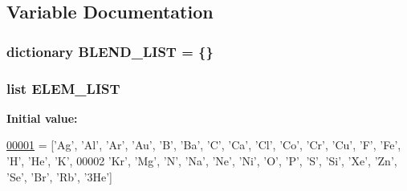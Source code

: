 \subsection{Variable Documentation}
\hypertarget{namespacepyneb_1_1utils_1_1init_ad9b77c5e4538ba2dda2b28727b3b01d7}{
\subsubsection[{B\-L\-E\-N\-D\-\_\-\-L\-I\-S\-T}]{\setlength{\rightskip}{0pt plus 5cm}dictionary B\-L\-E\-N\-D\-\_\-\-L\-I\-S\-T = \{\}}}\label{namespacepyneb_1_1utils_1_1init_ad9b77c5e4538ba2dda2b28727b3b01d7}
\hypertarget{namespacepyneb_1_1utils_1_1init_af5a11a312a4ec31ace89027a644a39f2}{
\subsubsection[{E\-L\-E\-M\-\_\-\-L\-I\-S\-T}]{\setlength{\rightskip}{0pt plus 5cm}list E\-L\-E\-M\-\_\-\-L\-I\-S\-T}}\label{namespacepyneb_1_1utils_1_1init_af5a11a312a4ec31ace89027a644a39f2}
{\bfseries Initial value\-:}
\begin{DoxyCode}
\hypertarget{namespacepyneb_1_1utils_1_1init_l00001}{}\hyperlink{namespacepyneb_1_1utils_1_1init}{00001} = [\textcolor{stringliteral}{'Ag'}, \textcolor{stringliteral}{'Al'}, \textcolor{stringliteral}{'Ar'}, \textcolor{stringliteral}{'Au'}, \textcolor{stringliteral}{'B'}, \textcolor{stringliteral}{'Ba'}, \textcolor{stringliteral}{'C'}, \textcolor{stringliteral}{'Ca'}, \textcolor{stringliteral}{'Cl'}, \textcolor{stringliteral}{'Co'}, \textcolor{stringliteral}{'Cr'}, \textcolor{stringliteral}{'Cu'}, \textcolor{stringliteral}{'F'}, \textcolor{stringliteral}{'Fe'}, \textcolor{stringliteral}{'H'}, \textcolor{stringliteral}{'He'}, \textcolor{stringliteral}{'K'},
00002              \textcolor{stringliteral}{'Kr'}, \textcolor{stringliteral}{'Mg'}, \textcolor{stringliteral}{'N'}, \textcolor{stringliteral}{'Na'}, \textcolor{stringliteral}{'Ne'}, \textcolor{stringliteral}{'Ni'}, \textcolor{stringliteral}{'O'}, \textcolor{stringliteral}{'P'}, \textcolor{stringliteral}{'S'}, \textcolor{stringliteral}{'Si'}, \textcolor{stringliteral}{'Xe'}, \textcolor{stringliteral}{'Zn'}, \textcolor{stringliteral}{'Se'}, \textcolor{stringliteral}{'Br'}, \textcolor{stringliteral}{'Rb'}, \textcolor{stringliteral}{'3He'}]
\end{DoxyCode}
